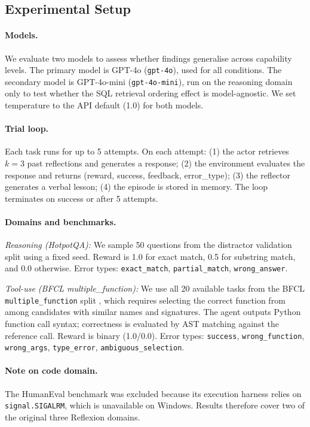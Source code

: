 \documentclass{article}
\begin{document}
\subsection{Experimental Setup}

\paragraph{Models.}
We evaluate two models to assess whether findings generalise across
capability levels. The primary model is GPT-4o (\texttt{gpt-4o}), used for
all conditions. The secondary model is GPT-4o-mini (\texttt{gpt-4o-mini}),
run on the reasoning domain only to test whether the SQL retrieval ordering
effect is model-agnostic. We set temperature to the API default (1.0) for
both models.

\paragraph{Trial loop.}
Each task runs for up to 5 attempts. On each attempt: (1) the actor
retrieves $k{=}3$ past reflections and generates a response; (2) the
environment evaluates the response and returns (reward, success, feedback,
error\_type); (3) the reflector generates a verbal lesson; (4) the episode
is stored in memory. The loop terminates on success or after 5 attempts.

\paragraph{Domains and benchmarks.}

\emph{Reasoning (HotpotQA):} We sample 50 questions from the distractor
validation split using a fixed seed. Reward is 1.0 for exact match, 0.5
for substring match, and 0.0 otherwise. Error types: \texttt{exact\_match},
\texttt{partial\_match}, \texttt{wrong\_answer}.

\emph{Tool-use (BFCL multiple\_function):} We use all 20 available tasks
from the BFCL \texttt{multiple\_function} split \citep{yan2024bfcl}, which
requires selecting the correct function from among candidates with similar
names and signatures. The agent outputs Python function call syntax;
correctness is evaluated by AST matching against the reference call.
Reward is binary (1.0/0.0). Error types: \texttt{success},
\texttt{wrong\_function}, \texttt{wrong\_args}, \texttt{type\_error},
\texttt{ambiguous\_selection}.

\paragraph{Note on code domain.}
The HumanEval benchmark \citep{chen2021humaneval} was excluded because its
execution harness relies on \texttt{signal.SIGALRM}, which is unavailable
on Windows. Results therefore cover two of the original three Reflexion
domains.
\end{document}

